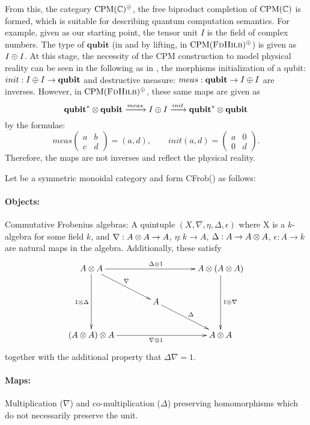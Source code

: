 From this, the category $\text{CPM}(\mathbb{C})^{\oplus}$, the free biproduct completion of $\text{CPM}(\mathbb{C})$ is
formed, which is suitable for describing quantum computation semantics. For example, given \fdh as
our starting point, the tensor unit $I$ is the field of complex numbers. The type of
$\mathbf{qubit}$ (in \fdh and by lifting, in $\text{CPM}(\textsc{FdHilb})^{\oplus}$) is given as $I\oplus I$. At this
stage, the necessity of the CPM construction to model physical reality can be seen in the following
as in \fdh, the morphisms initialization of a qubit: $init:I\oplus I \to \mathbf{qubit}$ and destructive
measure: $meas: \mathbf{qubit} \to I\oplus I$ are inverses. However, in $\text{CPM}(\textsc{FdHilb})^{\oplus}$, these
same maps are given as
\[
  {\mathbf{qubit}}^{*} \otimes \mathbf{qubit} \xrightarrow{meas} I\oplus
    I \xrightarrow{init}{\mathbf{qubit}}^{*} \otimes \mathbf{qubit}
\]
by the formulae:
\[
  meas
  \begin{pmatrix}
    a & b \\
    c & d
  \end{pmatrix}
  = (a,d), \qquad init(a,d) =
  \begin{pmatrix}
    a &0 \\
    0 & d
  \end{pmatrix}.
\]
Therefore, the maps are not inverses and reflect the physical reality.


\begin{example}\label{example:commfrob}
  Let \X be a symmetric monoidal category and form CFrob(\X) as follows: \paragraph{Objects:}
  Commutative Frobenius algebras\cite{kock04}: A quintuple $(X,\nabla,\eta,\Delta,\epsilon)$ where
  X is a $k$-algebra for some field $k$, and $\nabla :A\otimes A \to A$, $\eta:k\to A$, $\Delta : A \to
  A\otimes A$, $\epsilon : A \to k$ are natural maps in the algebra. Additionally, these satisfy
  \[
    \xymatrix @C=40pt @R=25pt{
      A \* A \ar[dd]_{1\*\Delta} \ar[dr]^{\nabla}
        \ar[rr]^{\Delta \* 1} & &
        A \* (A \* A) \ar[dd]^{1 \* \nabla}\\
      & A \ar[dr]^{\Delta} & \\
      (A \* A) \* A \ar[rr]_{\nabla \* 1} & &
        A \* A
    }
  \]
  together with the additional property that $\Delta \nabla = 1$.

  \paragraph{Maps:} Multiplication ($\nabla$) and co-multiplication ($\Delta$) preserving
  homomorphisms which do not necessarily preserve the unit.
\end{example}


